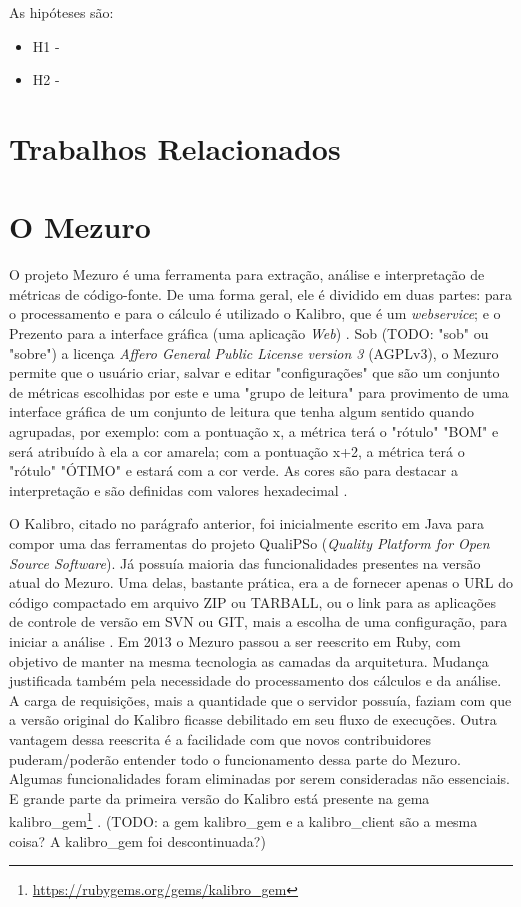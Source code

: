 As hipóteses são:

\begin{itemize}
  \item H1 - 
  \item H2 - 
\end{itemize}


\section{Trabalhos Relacionados}

\section{O Mezuro}

O projeto Mezuro é uma ferramenta para extração, análise e interpretação de
métricas de código-fonte. De uma forma geral, ele é dividido em duas partes:
para o processamento e para o cálculo é utilizado o Kalibro, que é um
\textit{webservice}; e o Prezento para a interface gráfica (uma aplicação
\textit{Web}) \cite{meirellesCibse2015}. Sob (TODO: "sob" ou "sobre") a licença
\textit{Affero General Public License version 3} (AGPLv3), o Mezuro permite que
o usuário criar, salvar e editar "configurações" que são um conjunto de
métricas escolhidas por este e uma "grupo de leitura" para provimento de uma
interface gráfica de um conjunto de leitura que tenha algum sentido quando
agrupadas, por exemplo: com a pontuação x, a métrica terá o "rótulo" "BOM" e
será atribuído à ela a cor amarela; com a pontuação x+2, a métrica terá o 
"rótulo" "ÓTIMO" e estará com a cor verde. As cores são para destacar a
interpretação e são definidas com valores hexadecimal \cite{camarinhaOSS2015}.

O Kalibro, citado no parágrafo anterior, foi inicialmente escrito em Java para
compor uma das ferramentas do projeto QualiPSo (\textit{Quality Platform for
Open Source Software}). Já possuía maioria das funcionalidades presentes na
versão atual do Mezuro. Uma delas, bastante prática, era a de fornecer apenas o
URL do código compactado em arquivo ZIP ou TARBALL, ou o link para as
aplicações de controle de versão em SVN ou GIT, mais a escolha de uma
configuração, para iniciar a análise \cite{camarinhaOSS2015}. Em 2013 o Mezuro
passou a ser reescrito em Ruby, com objetivo de manter na mesma tecnologia as
camadas da arquitetura. Mudança justificada também pela necessidade do
processamento dos cálculos e da análise. A carga de requisições, mais a
quantidade que o servidor possuía, faziam com que a versão original do Kalibro
ficasse debilitado em seu fluxo de execuções. Outra vantagem dessa reescrita é
a facilidade com que novos contribuidores puderam/poderão entender todo o
funcionamento dessa parte do Mezuro. Algumas funcionalidades foram eliminadas
por serem consideradas não essenciais. E grande parte da primeira versão do
Kalibro está presente na gema kalibro\_gem\footnote{\url{https://rubygems.org/gems/kalibro_gem}}
\cite{meirellesCibse2015}.
(TODO: a gem kalibro\_gem e a kalibro\_client são a mesma coisa? A kalibro\_gem
foi descontinuada?)


